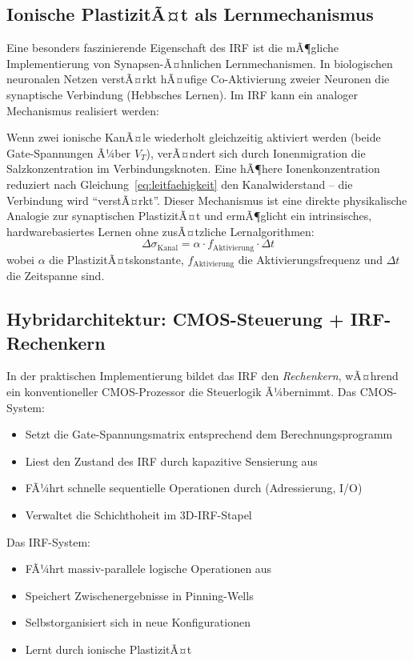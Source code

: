 ﻿\documentclass[a4paper,12pt]{scrreprt}
\theoremstyle{definition}
\begin{document}
\subsection{Ionische PlastizitÃ¤t als Lernmechanismus}

Eine besonders faszinierende Eigenschaft des IRF ist die mÃ¶gliche Implementierung
von Synapsen-Ã¤hnlichen Lernmechanismen. In biologischen neuronalen Netzen
verstÃ¤rkt hÃ¤ufige Co-Aktivierung zweier Neuronen die synaptische Verbindung
(Hebbsches Lernen). Im IRF kann ein analoger Mechanismus realisiert werden:

Wenn zwei ionische KanÃ¤le wiederholt gleichzeitig aktiviert werden (beide
Gate-Span\-nungen Ã¼ber $V_T$), verÃ¤ndert sich durch Ionenmigration die
Salzkonzentration im Verbindungsknoten. Eine hÃ¶here Ionenkonzentration
reduziert nach Gleichung~\eqref{eq:leitfaehigkeit} den Kanalwiderstand --
die Verbindung wird ``verstÃ¤rkt''. Dieser Mechanismus ist eine direkte
physikalische Analogie zur synaptischen PlastizitÃ¤t und ermÃ¶glicht
ein intrinsisches, hardwarebasiertes Lernen ohne zusÃ¤tzliche
Lernalgorithmen:
\begin{equation}
	\Delta \sigma_{\mathrm{Kanal}} = \alpha \cdot f_{\mathrm{Aktivierung}} \cdot \Delta t
	\label{eq:ionische_plastizitaet}
\end{equation}
wobei $\alpha$ die PlastizitÃ¤tskonstante, $f_{\mathrm{Aktivierung}}$ die
Aktivierungsfrequenz und $\Delta t$ die Zeitspanne sind.

\subsection{Hybridarchitektur: CMOS-Steuerung + IRF-Rechenkern}

In der praktischen Implementierung bildet das IRF den \emph{Rechenkern},
wÃ¤hrend ein konventioneller CMOS-Prozessor die Steuerlogik Ã¼bernimmt.
Das CMOS-System:
\begin{itemize}
	\item Setzt die Gate-Spannungsmatrix entsprechend dem Berechnungsprogramm
	\item Liest den Zustand des IRF durch kapazitive Sensierung aus
	\item FÃ¼hrt schnelle sequentielle Operationen durch (Adressierung, I/O)
	\item Verwaltet die Schichthoheit im 3D-IRF-Stapel
\end{itemize}

Das IRF-System:
\begin{itemize}
	\item FÃ¼hrt massiv-parallele logische Operationen aus
	\item Speichert Zwischenergebnisse in Pinning-Wells
	\item Selbstorganisiert sich in neue Konfigurationen
	\item Lernt durch ionische PlastizitÃ¤t
\end{itemize}
\end{document}
